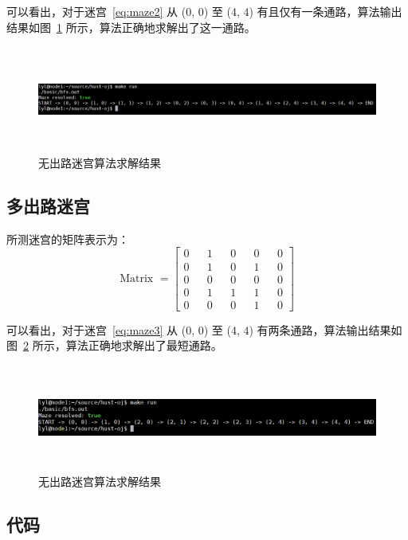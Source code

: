 \documentclass[UTF8,cs4size]{ctexart}
\begin{document}
可以看出，对于迷宫~\eqref{eq:maze2} 从 (0, 0) 至 (4, 4) 有且仅有一条通路，算法输出结果如图~\ref{fig:maze2} 所示，算法正确地求解出了这一通路。
\begin{figure}[htb]
  \centering
    \includegraphics[width=\textwidth,height=3.5cm]{figures/assign1_maze2.png}
  \caption{无出路迷宫算法求解结果}
  \label{fig:maze2}
\end{figure}

\subsection{多出路迷宫}
所测迷宫的矩阵表示为：
\begin{equation}
  \text{Matrix } =
  \begin{bmatrix}
    0 && 1 && 0 && 0 && 0 \\
    0 && 1 && 0 && 1 && 0 \\
    0 && 0 && 0 && 0 && 0 \\
    0 && 1 && 1 && 1 && 0 \\
    0 && 0 && 0 && 1 && 0
    \label{eq:maze3}
  \end{bmatrix}
\end{equation}

可以看出，对于迷宫~\eqref{eq:maze3} 从 (0, 0) 至 (4, 4) 有两条通路，算法输出结果如图~\ref{fig:maze3} 所示，算法正确地求解出了最短通路。
\begin{figure}[htb]
  \centering
    \includegraphics[width=\textwidth,height=3.5cm]{figures/assign1_maze3.png}
  \caption{无出路迷宫算法求解结果}
  \label{fig:maze3}
\end{figure}

\clearpage



\newpage

\begin{appendices}
\section{代码}

\end{appendices}
\end{document}
